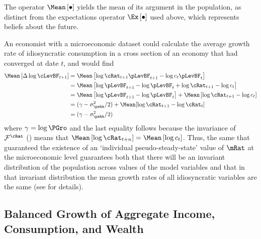\documentclass[BufferStockTheory]{subfiles}
\begin{document}
The operator $\Mean\left[\bullet\right]$ yields the mean of its argument in the population, as distinct from the expectations operator $\Ex\left[\bullet\right]$ used above, which represents beliefs about the future.

An economist with a microeconomic dataset could calculate the average growth rate of idiosyncratic consumption in a cross section of an economy that had converged at date $t$, and would find
\begin{align*}
  \Mean\left[\Delta \log \cLevBF_{t+1}\right]  & = \Mean\left[ \log {\cRat}_{t+1}\pLevBF_{t+1} - \log c_{t}\pLevBF_{t}\right]  \notag \\
                                               & = \Mean\left[ \log \pLevBF_{t+1}- \log \pLevBF_{t} + \log {\cRat}_{t+1} - \log c_{t}\right]  \notag \\
                                               & = \Mean\left[ \log \pLevBF_{t+1}- \log \pLevBF_{t}\right] + \Mean\left[ \log {\cRat}_{t+1} - \log c_{t}\right]  \notag \\
                                               & = (\gamma - \sigma^{2}_{\pshk}/2) + \Mean[\log \cRat_{t+1} - \log \cRat_{t}] \\
                                               & = (\gamma - \sigma^{2}_{\pshk}/2)
\end{align*}
where $\gamma=\log \PGro$ and the last equality follows because the invariance of
 $\mathcal{F}^{\cRat}$ (\cite{szeidlInvariant}) means that $\Mean\left[ \log
  {\cRat}_{t+n}\right] = \Mean\left[ \log
  c_{t}\right]$.  Thus, the same {\GIC} that guaranteed the existence of an `individual pseudo-steady-state' value of $\mRat$ at the microeconomic level guarantees both that there will be an invariant distribution of the population across values of the model variables and that in that invariant distribution the mean growth rates of all idiosyncratic variables are the same (see \cite{szeidlInvariant} for details).

\hypertarget{Growth-Rates-of-Aggregate-Income-and-Consumption}{}
\subsection{Balanced Growth of Aggregate Income, Consumption, and Wealth}
\label{subsec:cGroEqPGroQ}

\end{document}
